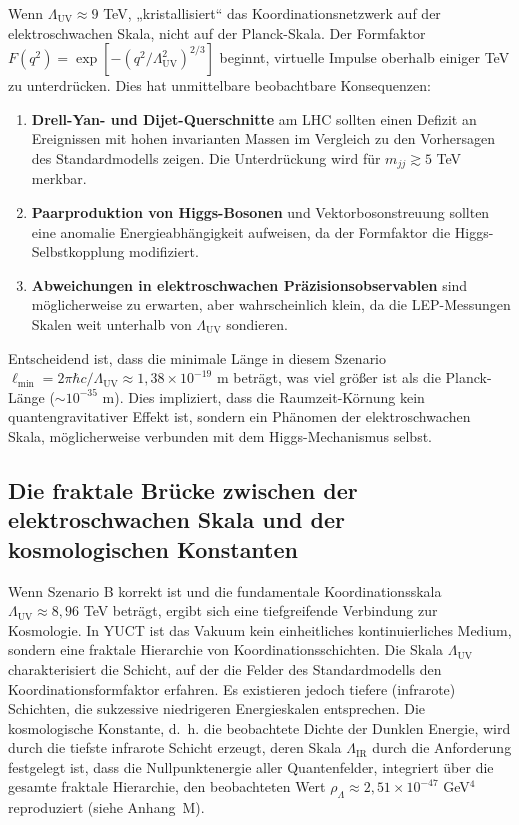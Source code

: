 \documentclass[11pt,a4paper]{article}
\newcommand{\Lmin}{\ell_{\min}}
\newcommand{\LUV}{\Lambda_{\mathrm{UV}}}
\theoremstyle{remark}
\begin{document}
	Wenn \(\LUV \approx 9\) TeV, „kristallisiert“ das Koordinationsnetzwerk auf der elektroschwachen Skala, nicht auf der Planck-Skala. Der Formfaktor \(F(q^2) = \exp[-(q^2/\LUV^2)^{2/3}]\) beginnt, virtuelle Impulse oberhalb einiger TeV zu unterdrücken. Dies hat unmittelbare beobachtbare Konsequenzen:
	
	\begin{enumerate}[label=(\arabic*)]
		\item \textbf{Drell-Yan- und Dijet-Querschnitte} am LHC sollten einen Defizit an Ereignissen mit hohen invarianten Massen im Vergleich zu den Vorhersagen des Standardmodells zeigen. Die Unterdrückung wird für \(m_{jj} \gtrsim 5\) TeV merkbar.
		\item \textbf{Paarproduktion von Higgs-Bosonen} und Vektorbosonstreuung sollten eine anomalie Energieabhängigkeit aufweisen, da der Formfaktor die Higgs-Selbstkopplung modifiziert.
		\item \textbf{Abweichungen in elektroschwachen Präzisionsobservablen} sind möglicherweise zu erwarten, aber wahrscheinlich klein, da die LEP-Messungen Skalen weit unterhalb von \(\LUV\) sondieren.
	\end{enumerate}
	
	Entscheidend ist, dass die minimale Länge in diesem Szenario \(\Lmin = 2\pi\hbar c/\LUV \approx 1,38\times 10^{-19}\) m beträgt, was viel größer ist als die Planck-Länge (\(\sim 10^{-35}\) m). Dies impliziert, dass die Raumzeit-Körnung kein quantengravitativer Effekt ist, sondern ein Phänomen der elektroschwachen Skala, möglicherweise verbunden mit dem Higgs-Mechanismus selbst.
	
	\subsection{Die fraktale Brücke zwischen der elektroschwachen Skala und der kosmologischen Konstanten}
	\label{subsec:bridge}
	
	Wenn Szenario B korrekt ist und die fundamentale Koordinationsskala \(\LUV \approx 8,96\) TeV beträgt, ergibt sich eine tiefgreifende Verbindung zur Kosmologie. In YUCT ist das Vakuum kein einheitliches kontinuierliches Medium, sondern eine fraktale Hierarchie von Koordinationsschichten. Die Skala \(\LUV\) charakterisiert die Schicht, auf der die Felder des Standardmodells den Koordinationsformfaktor erfahren. Es existieren jedoch tiefere (infrarote) Schichten, die sukzessive niedrigeren Energieskalen entsprechen. Die kosmologische Konstante, d.~h. die beobachtete Dichte der Dunklen Energie, wird durch die tiefste infrarote Schicht erzeugt, deren Skala \(\Lambda_{\mathrm{IR}}\) durch die Anforderung festgelegt ist, dass die Nullpunktenergie aller Quantenfelder, integriert über die gesamte fraktale Hierarchie, den beobachteten Wert \(\rho_{\Lambda} \approx 2,51 \times 10^{-47}\) GeV\(^4\) reproduziert (siehe Anhang~M).
	
\end{document}
